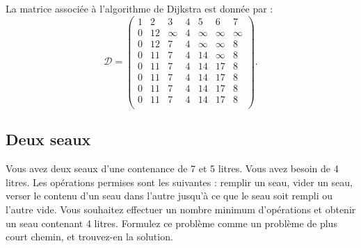 \begin{solution}
  La matrice associée à l'algorithme de Dijkstra est donnée par :
  \[
    \mathcal{D}=
    \begin{pmatrix}
      1 & 2   & 3       & 4  & 5          & 6 & 7 \\
      \boxed{0} & 12 & \infty & 4 & \infty    &\infty & \infty  \\
      \boxed{0} & 12 & 7       & \boxed{4} & \infty    & \infty  & 8  \\
      \boxed{0} & 11 & \boxed{7}       &\boxed{4} & 14         & \infty  & 8\\
      \boxed{0} & 11 & \boxed{7}       & \boxed{4}& 14         & 17 & \boxed{8}\\
      \boxed{0} & \boxed{11} & \boxed{7}       & \boxed{4} & 14         & 17 &  \boxed{8}\\
      \boxed{0} & \boxed{11} & \boxed{7}      & \boxed{4} & \boxed{14}         & 17 &  \boxed{8}\\
      \boxed{0} & \boxed{11}& \boxed{7}       & \boxed{4} & \boxed{14}         & \boxed{17} &  \boxed{8}\\
    \end{pmatrix}.
  \]
\end{solution}

\subsection{Deux seaux} Vous avez deux seaux d'une contenance de 7 et 5 litres. Vous avez besoin de 4 litres. Les opérations permises sont les suivantes : remplir un seau, vider un seau, verser le contenu d'un seau dans l'autre jusqu'à ce que le seau soit rempli ou l'autre vide. Vous souhaitez effectuer un nombre minimum d'opérations et obtenir un seau contenant 4 litres. Formulez ce problème comme un problème de plus court chemin, et trouvez-en la solution.

